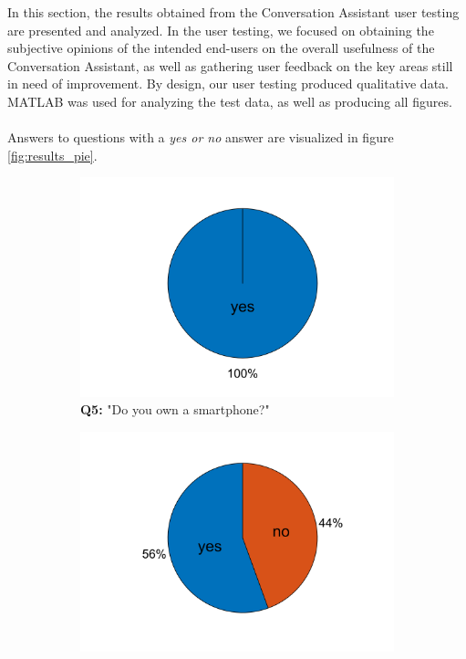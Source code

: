 \documentclass[english, 12pt, a4paper, pdftex, elec, utf8]{aaltothesis}
\begin{document}
In this section, the results obtained from the Conversation Assistant user testing are presented and analyzed. In the user testing, we focused on obtaining the subjective opinions of the intended end-users on the overall usefulness of the Conversation Assistant, as well as gathering user feedback on the key areas still in need of improvement. By design, our user testing produced qualitative data. MATLAB was used for analyzing the test data, as well as producing all figures. \\\\
Answers to questions with a \textit{yes or no} answer are visualized in figure \ref{fig:results_pie}. 
\begin{figure}[b]
	\centering
	\begin{subfigure}[b]{0.45\textwidth}
		\includegraphics[width=\textwidth, trim={1.5cm 0.6cm 1.5cm 0.2cm}, clip]{T1_1.png}
		\caption*{\textbf{Q5:} "Do you own a smartphone?" \vspace{2mm}}
	\end{subfigure} \hspace{5mm}
	\begin{subfigure}[b]{0.45\textwidth}
		\includegraphics[width=\textwidth, trim={1.5cm 0.6cm 1.5cm 0.2cm}, clip]{T1_2.png}

\end{subfigure}
\end{figure}
\end{document}
